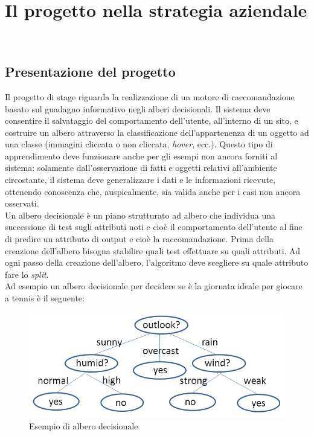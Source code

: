
\chapter{Il progetto nella strategia aziendale}
\label{cap:processi-metodologie}

\\

\section{Presentazione del progetto}
Il progetto di stage riguarda la realizzazione di un motore di raccomandazione basato sul guadagno informativo negli alberi decisionali. Il sistema deve consentire il salvataggio del comportamento dell'utente, all'interno di un sito, e costruire un albero attraverso la classificazione dell'appartenenza di un oggetto ad una classe (immagini cliccata o non cliccata, \textit{hover}, ecc.). Questo tipo di apprendimento deve funzionare anche per gli esempi non ancora forniti al sistema: solamente dall'osservazione di fatti e oggetti relativi all'ambiente circostante, il sistema deve generalizzare i dati e le informazioni ricevute, ottenendo conoscenza che, auspicalmente, sia valida anche per i casi non ancora osservati.\\
Un albero decisionale è un piano strutturato ad albero che individua una successione di test sugli attributi noti e cioè il comportamento dell'utente al fine di predire un attributo  di output e cioè la raccomandazione. Prima della creazione dell'albero bisogna stabilire quali test effettuare su quali attributi. Ad ogni passo della creazione dell'albero, l'algoritmo deve scegliere su quale attributo fare lo \textit{split}.\\
Ad esempio un albero decisionale per decidere  se è la giornata ideale per giocare a tennis è il seguente:
\begin{figure}[h]
\centering
\includegraphics[width=0.7\linewidth]{immagini/play}
\caption[Esempio di albero decisionale]{Esempio di albero decisionale}
\label{fig:albero-decisionale-esempio}
\end{figure}

